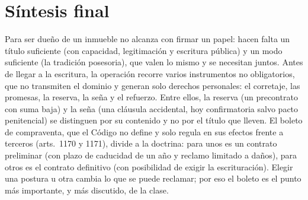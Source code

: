 \documentclass[12pt,oneside]{book}
\begin{document}
\chapter*{Síntesis final}

\begin{important}
Para ser dueño de un inmueble no alcanza con firmar un papel: hacen falta un título suficiente (con capacidad, legitimación y escritura pública) y un modo suficiente (la tradición posesoria), que valen lo mismo y se necesitan juntos. Antes de llegar a la escritura, la operación recorre varios instrumentos no obligatorios, que no transmiten el dominio y generan solo derechos personales: el corretaje, las promesas, la reserva, la seña y el refuerzo. Entre ellos, la reserva (un precontrato con suma baja) y la seña (una cláusula accidental, hoy confirmatoria salvo pacto penitencial) se distinguen por su contenido y no por el título que lleven. El boleto de compraventa, que el Código no define y solo regula en sus efectos frente a terceros (arts.~1170 y 1171), divide a la doctrina: para unos es un contrato preliminar (con plazo de caducidad de un año y reclamo limitado a daños), para otros es el contrato definitivo (con posibilidad de exigir la escrituración). Elegir una postura u otra cambia lo que se puede reclamar; por eso el boleto es el punto más importante, y más discutido, de la clase.
\end{important}
\end{document}
